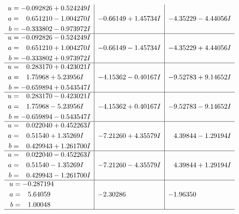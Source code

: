 \documentclass[1p]{elsarticle_modified}
\theoremstyle{definition}
\begin{document}
$$\begin{array}{c|c|c}
\begin{aligned}
u &= -0.092826 + 0.524249 I \\
a &= \phantom{-}0.651210 - 1.004270 I \\
b &= -0.333802 - 0.973972 I\end{aligned}
 & -0.66149 + 1.45734 I & -4.35229 - 4.44056 I \\ \hline\begin{aligned}
u &= -0.092826 - 0.524249 I \\
a &= \phantom{-}0.651210 + 1.004270 I \\
b &= -0.333802 + 0.973972 I\end{aligned}
 & -0.66149 - 1.45734 I & -4.35229 + 4.44056 I \\ \hline\begin{aligned}
u &= \phantom{-}0.283170 + 0.423021 I \\
a &= \phantom{-}1.75968 + 5.23956 I \\
b &= -0.659894 + 0.543547 I\end{aligned}
 & -4.15362 - 0.40167 I & -9.52783 + 9.14652 I \\ \hline\begin{aligned}
u &= \phantom{-}0.283170 - 0.423021 I \\
a &= \phantom{-}1.75968 - 5.23956 I \\
b &= -0.659894 - 0.543547 I\end{aligned}
 & -4.15362 + 0.40167 I & -9.52783 - 9.14652 I \\ \hline\begin{aligned}
u &= \phantom{-}0.022040 + 0.452263 I \\
a &= \phantom{-}0.51540 + 1.35269 I \\
b &= \phantom{-}0.429943 + 1.261700 I\end{aligned}
 & -7.21260 + 4.35579 I & \phantom{-}4.39844 - 1.29194 I \\ \hline\begin{aligned}
u &= \phantom{-}0.022040 - 0.452263 I \\
a &= \phantom{-}0.51540 - 1.35269 I \\
b &= \phantom{-}0.429943 - 1.261700 I\end{aligned}
 & -7.21260 - 4.35579 I & \phantom{-}4.39844 + 1.29194 I \\ \hline\begin{aligned}
u &= -0.287194\phantom{ +0.000000I} \\
a &= \phantom{-}5.64059\phantom{ +0.000000I} \\
b &= \phantom{-}1.00048\phantom{ +0.000000I}\end{aligned}
 & -2.30286\phantom{ +0.000000I} & -1.96350\phantom{ +0.000000I}\\
 \hline 
 \end{array}$$\newpage\newpage\renewcommand{\arraystretch}{1}
\end{document}
